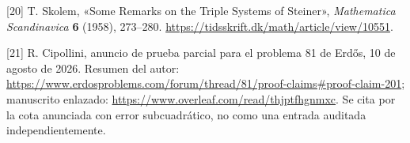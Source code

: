 \documentclass[spanish,11pt,a4paper]{article}
\begin{document}
{[}20{]} T. Skolem, «Some Remarks on the Triple Systems of Steiner», \emph{Mathematica Scandinavica} \textbf{6} (1958), 273--280. \url{https://tidsskrift.dk/math/article/view/10551}.

{[}21{]} R. Cipollini, anuncio de prueba parcial para el problema 81 de Erdős, 10 de agosto de 2026. Resumen del autor: \url{https://www.erdosproblems.com/forum/thread/81/proof-claims\#proof-claim-201}; manuscrito enlazado: \url{https://www.overleaf.com/read/thjptfhgnmxc}. Se cita por la cota anunciada con error subcuadrático, no como una entrada auditada independientemente.

\endgroup
\end{document}
